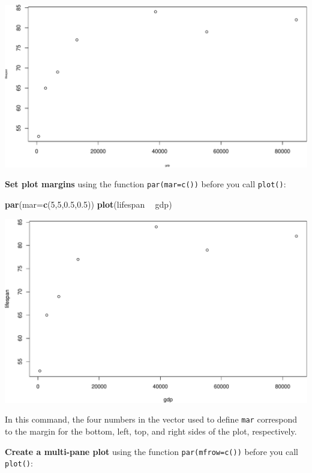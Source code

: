 \documentclass[
]{book}
\newenvironment{Shaded}{\begin{snugshade}}{\end{snugshade}}
\newcommand{\DataTypeTok}[1]{\textcolor[rgb]{0.13,0.29,0.53}{#1}}
\newcommand{\DecValTok}[1]{\textcolor[rgb]{0.00,0.00,0.81}{#1}}
\newcommand{\FloatTok}[1]{\textcolor[rgb]{0.00,0.00,0.81}{#1}}
\newcommand{\KeywordTok}[1]{\textcolor[rgb]{0.13,0.29,0.53}{\textbf{#1}}}
\newcommand{\NormalTok}[1]{#1}
\newcommand{\OperatorTok}[1]{\textcolor[rgb]{0.81,0.36,0.00}{\textbf{#1}}}
\newcommand{\StringTok}[1]{\textcolor[rgb]{0.31,0.60,0.02}{#1}}
\begin{document}
\includegraphics{figures/unnamed-chunk-108-1.pdf}

\textbf{Set plot margins} using the function \texttt{par(mar=c())} before you call \texttt{plot()}:

\begin{Shaded}
\begin{Highlighting}[]
\KeywordTok{par}\NormalTok{(}\DataTypeTok{mar=}\KeywordTok{c}\NormalTok{(}\DecValTok{5}\NormalTok{,}\DecValTok{5}\NormalTok{,}\FloatTok{0.5}\NormalTok{,}\FloatTok{0.5}\NormalTok{))}
\KeywordTok{plot}\NormalTok{(lifespan }\OperatorTok{~}\StringTok{ }\NormalTok{gdp)}
\end{Highlighting}
\end{Shaded}

\includegraphics{figures/unnamed-chunk-109-1.pdf}

In this command, the four numbers in the vector used to define \texttt{mar} correspond to the margin for the bottom, left, top, and right sides of the plot, respectively.

\textbf{Create a multi-pane plot} using the function \texttt{par(mfrow=c())} before you call \texttt{plot()}:
\end{document}
